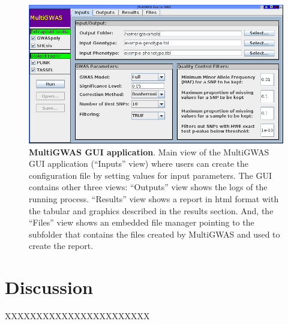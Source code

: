 \documentclass{article}
\begin{document}
\begin{figure}[H]
\begin{centering}
\includegraphics[scale=0.5]{images/paper-implementation-jmultiGWAS}
\par\end{centering}
\caption{\scriptsize\textbf{MultiGWAS GUI application}. Main view of the MultiGWAS
GUI application (``Inputs'' view) where users can create the configuration
file by setting values for input parameters. The GUI contains other
three views: ``Outputs'' view shows the logs of the running process.
``Results'' view shows a report in html format with the tabular
and graphics described in the results section. And, the ``Files''
view shows an embedded file manager pointing to the subfolder that
contains the files created by MultiGWAS and used to create the report.
\protect \\
\label{fig:MultiGWAS-interaction}}
\end{figure}


















\section{Discussion}
XXXXXXXXXXXXXXXXXXXXXXX
\end{document}
